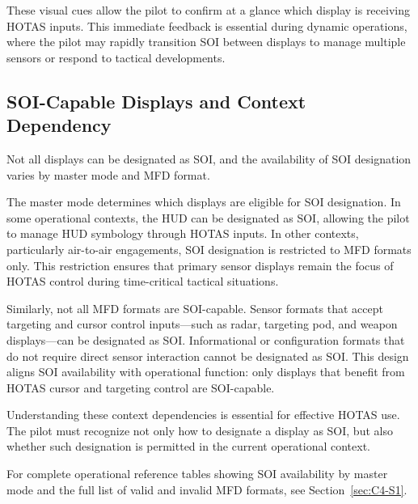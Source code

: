 \documentclass[11pt, a4paper, twoside]{report}
\begin{document}
These visual cues allow the pilot to confirm at a glance which display is receiving HOTAS inputs. This immediate feedback is essential during dynamic operations, where the pilot may rapidly transition SOI between displays to manage multiple sensors or respond to tactical developments.


\subsection{SOI-Capable Displays and Context Dependency}
\label{sec:C2-S1-S3}

Not all displays can be designated as SOI, and the availability of SOI designation varies by master mode and MFD format.

The master mode determines which displays are eligible for SOI designation. In some operational contexts, the HUD can be designated as SOI, allowing the pilot to manage HUD symbology through HOTAS inputs. In other contexts, particularly air-to-air engagements, SOI designation is restricted to MFD formats only. This restriction ensures that primary sensor displays remain the focus of HOTAS control during time-critical tactical situations.

Similarly, not all MFD formats are SOI-capable. Sensor formats that accept targeting and cursor control inputs—such as radar, targeting pod, and weapon displays—can be designated as SOI. Informational or configuration formats that do not require direct sensor interaction cannot be designated as SOI. This design aligns SOI availability with operational function: only displays that benefit from HOTAS cursor and targeting control are SOI-capable.

Understanding these context dependencies is essential for effective HOTAS use. The pilot must recognize not only how to designate a display as SOI, but also whether such designation is permitted in the current operational context.

For complete operational reference tables showing SOI availability by master mode and the full list of valid and invalid MFD formats, see Section~\ref{sec:C4-S1}.

\end{document}
